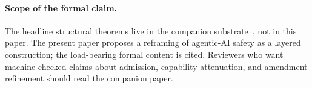 \paragraph{Scope of the formal claim.}
The headline structural theorems live in the companion substrate~\cite{programmableSovereignty2026}, not in this paper. The present paper proposes a reframing of agentic-AI safety as a layered construction; the load-bearing formal content is cited. Reviewers who want machine-checked claims about admission, capability attenuation, and amendment refinement should read the companion paper.
